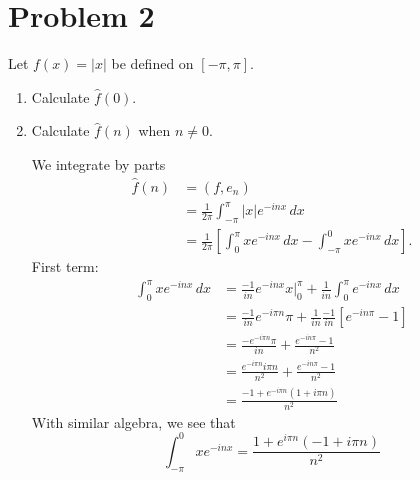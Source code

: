 \documentclass[11pt]{article}
\begin{document}
\section*{Problem 2}
\begin{problem}
    Let $f(x) = |x|$ be defined on $[-\pi, \pi].$
    \begin{enumerate}
        \item Calculate $\hat{f}(0).$
        \item Calculate $\hat{f}(n)$ when $n \neq 0.$
        \begin{solution}
    We integrate by parts
\begin{align*}
    \hat{f}(n) &= (f,e_n)\\
    &= \frac{1}{2\pi}\int_{-\pi}^\pi |x|e^{-inx}\,dx\\
    &= \frac{1}{2\pi}\left[\int_0^\pi x e^{-inx}\,dx - \int_{-\pi}^0 x e^{-inx}\, dx\right].
\end{align*}
First term:
\begin{align*}
    \int_0^\pi x e^{-inx}\,dx &= \frac{-1}{in}e^{-inx}x\bigg|_0^{\pi} + \frac{1}{in}\int_0^\pi e^{-inx}\,dx\\
    &=\frac{-1}{in}e^{-i\pi n}\pi + \frac{1}{in}\frac{-1}{in}\left[e^{-in\pi} - 1\right]\\
    &= \frac{-e^{-i\pi n}\pi}{in} + \frac{e^{-in \pi} -1}{n^2}\\
    &= \frac{e^{-i\pi n} i \pi n}{n^2} + \frac{e^{-in \pi} -1}{n^2}\\
    &= \frac{-1 + e^{-i\pi n}(1 + i\pi n)}{n^2}
\end{align*}
With similar algebra, we see that 
\[\int_{-\pi}^0 x e^{-inx} = \frac{1 + e^{i\pi n}(-1 + i\pi n)}{n^2}\]


\end{solution}
\end{enumerate}
\end{problem}
\end{document}
